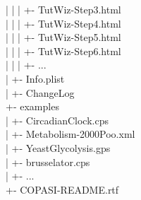 \documentclass[12pt]{book}
\begin{document}
{\begin{tabbing}
 \> | \> | \> | \> \> +- TutWiz-Step3.html \\
 \> | \> | \> | \> \> +- TutWiz-Step4.html \\
 \> | \> | \> | \> \> +- TutWiz-Step5.html \\
 \> | \> | \> | \> \> +- TutWiz-Step6.html \\
 \> | \> | \> | \> \> +- ... \\
 \> | \> +- Info.plist \\
 \> | \> +- ChangeLog \\
 \> +- examples \\
 \> | \> +- CircadianClock.cps \\
 \> | \> +- Metabolism-2000Poo.xml \\
 \> | \> +- YeastGlycolysis.gps \\
 \> | \> +- brusselator.cps \\
 \> | \> +- ... \\
 \> +- COPASI-README.rtf \\
\end{tabbing}
}
\end{document}
